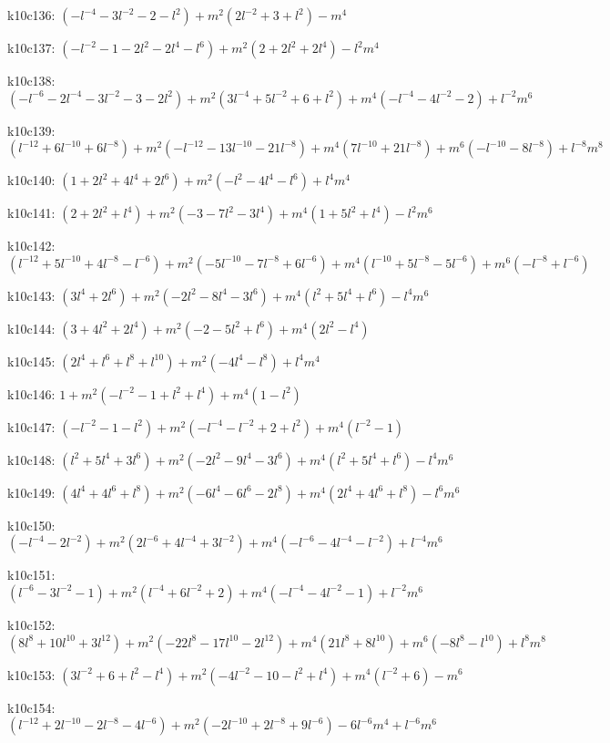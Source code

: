 k10c136: $ (-l^{-4}-3l^{-2}-2-l^{2})  +m^{2}(2l^{-2}+3+l^{2})  -m^{4} $ 

k10c137: $ (-l^{-2}-1-2l^{2}-2l^{4}-l^{6})  +m^{2}(2+2l^{2}+2l^{4})  -l^{2}m^{4} $ 

k10c138: $ (-l^{-6}-2l^{-4}-3l^{-2}-3-2l^{2})  +m^{2}(3l^{-4}+5l^{-2}+6+l^{2})  +m^{4}(-l^{-4}-4l^{-2}-2)  +l^{-2}m^{6} $ 

k10c139: $ (l^{-12}+6l^{-10}+6l^{-8})  +m^{2}(-l^{-12}-13l^{-10}-21l^{-8})  +m^{4}(7l^{-10}+21l^{-8})  +m^{6}(-l^{-10}-8l^{-8})  +l^{-8}m^{8} $ 

k10c140: $ (1+2l^{2}+4l^{4}+2l^{6})  +m^{2}(-l^{2}-4l^{4}-l^{6})  +l^{4}m^{4} $ 

k10c141: $ (2+2l^{2}+l^{4})  +m^{2}(-3-7l^{2}-3l^{4})  +m^{4}(1+5l^{2}+l^{4})  -l^{2}m^{6} $ 

k10c142: $ (l^{-12}+5l^{-10}+4l^{-8}-l^{-6})  +m^{2}(-5l^{-10}-7l^{-8}+6l^{-6})  +m^{4}(l^{-10}+5l^{-8}-5l^{-6})  +m^{6}(-l^{-8}+l^{-6}) $ 

k10c143: $ (3l^{4}+2l^{6})  +m^{2}(-2l^{2}-8l^{4}-3l^{6})  +m^{4}(l^{2}+5l^{4}+l^{6})  -l^{4}m^{6} $ 

k10c144: $ (3+4l^{2}+2l^{4})  +m^{2}(-2-5l^{2}+l^{6})  +m^{4}(2l^{2}-l^{4}) $ 

k10c145: $ (2l^{4}+l^{6}+l^{8}+l^{10})  +m^{2}(-4l^{4}-l^{8})  +l^{4}m^{4} $ 

k10c146: $ 1  +m^{2}(-l^{-2}-1+l^{2}+l^{4})  +m^{4}(1-l^{2}) $ 

k10c147: $ (-l^{-2}-1-l^{2})  +m^{2}(-l^{-4}-l^{-2}+2+l^{2})  +m^{4}(l^{-2}-1) $ 

k10c148: $ (l^{2}+5l^{4}+3l^{6})  +m^{2}(-2l^{2}-9l^{4}-3l^{6})  +m^{4}(l^{2}+5l^{4}+l^{6})  -l^{4}m^{6} $ 

k10c149: $ (4l^{4}+4l^{6}+l^{8})  +m^{2}(-6l^{4}-6l^{6}-2l^{8})  +m^{4}(2l^{4}+4l^{6}+l^{8})  -l^{6}m^{6} $ 

k10c150: $ (-l^{-4}-2l^{-2})  +m^{2}(2l^{-6}+4l^{-4}+3l^{-2})  +m^{4}(-l^{-6}-4l^{-4}-l^{-2})  +l^{-4}m^{6} $ 

k10c151: $ (l^{-6}-3l^{-2}-1)  +m^{2}(l^{-4}+6l^{-2}+2)  +m^{4}(-l^{-4}-4l^{-2}-1)  +l^{-2}m^{6} $ 

k10c152: $ (8l^{8}+10l^{10}+3l^{12})  +m^{2}(-22l^{8}-17l^{10}-2l^{12})  +m^{4}(21l^{8}+8l^{10})  +m^{6}(-8l^{8}-l^{10})  +l^{8}m^{8} $ 

k10c153: $ (3l^{-2}+6+l^{2}-l^{4})  +m^{2}(-4l^{-2}-10-l^{2}+l^{4})  +m^{4}(l^{-2}+6)  -m^{6} $ 

k10c154: $ (l^{-12}+2l^{-10}-2l^{-8}-4l^{-6})  +m^{2}(-2l^{-10}+2l^{-8}+9l^{-6})  -6l^{-6}m^{4}  +l^{-6}m^{6} $ 

